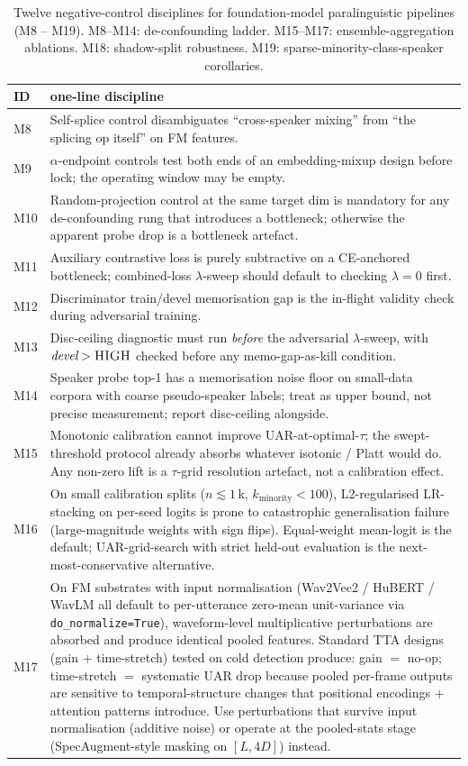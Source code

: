 \begin{table}[t]
\centering\footnotesize
\caption{Twelve negative-control disciplines for foundation-model paralinguistic pipelines (M8 -- M19). M8--M14: de-confounding ladder. M15--M17: ensemble-aggregation ablations. M18: shadow-split robustness. M19: sparse-minority-class-speaker corollaries.}
\label{tab:m_disciplines}
\begin{tabular}{lp{}}
\toprule
ID & one-line discipline \\
\midrule
M8  & Self-splice control disambiguates ``cross-speaker mixing'' from ``the splicing op itself'' on FM features. \\
M9  & $\alpha$-endpoint controls test both ends of an embedding-mixup design before lock; the operating window may be empty. \\
M10 & Random-projection control at the same target dim is mandatory for any de-confounding rung that introduces a bottleneck; otherwise the apparent probe drop is a bottleneck artefact. \\
M11 & Auxiliary contrastive loss is purely subtractive on a CE-anchored bottleneck; combined-loss $\lambda$-sweep should default to checking $\lambda{=}0$ first. \\
M12 & Discriminator train/devel memorisation gap is the in-flight validity check during adversarial training. \\
M13 & Disc-ceiling diagnostic must run \emph{before} the adversarial $\lambda$-sweep, with $\textit{devel} > \textsc{HIGH}$ checked before any memo-gap-as-kill condition. \\
M14 & Speaker probe top-1 has a memorisation noise floor on small-data corpora with coarse pseudo-speaker labels; treat as upper bound, not precise measurement; report disc-ceiling alongside. \\
\midrule
M15 & Monotonic calibration cannot improve UAR-at-optimal-$\tau$; the swept-threshold protocol already absorbs whatever isotonic / Platt would do. Any non-zero lift is a $\tau$-grid resolution artefact, not a calibration effect. \\
M16 & On small calibration splits ($n \lesssim 1$\,k, $k_{\text{minority}} < 100$), L2-regularised LR-stacking on per-seed logits is prone to catastrophic generalisation failure (large-magnitude weights with sign flips). Equal-weight mean-logit is the default; UAR-grid-search with strict held-out evaluation is the next-most-conservative alternative. \\
M17 & On FM substrates with input normalisation (Wav2Vec2 / HuBERT / WavLM all default to per-utterance zero-mean unit-variance via \texttt{do\_normalize=True}), waveform-level multiplicative perturbations are absorbed and produce identical pooled features. Standard TTA designs (gain + time-stretch) tested on cold detection produce: gain $=$ no-op; time-stretch $=$ systematic UAR drop because pooled per-frame outputs are sensitive to temporal-structure changes that positional encodings + attention patterns introduce. Use perturbations that survive input normalisation (additive noise) or operate at the pooled-stats stage (SpecAugment-style masking on $[L, 4D]$) instead. \\

\end{tabular}
\end{table}

